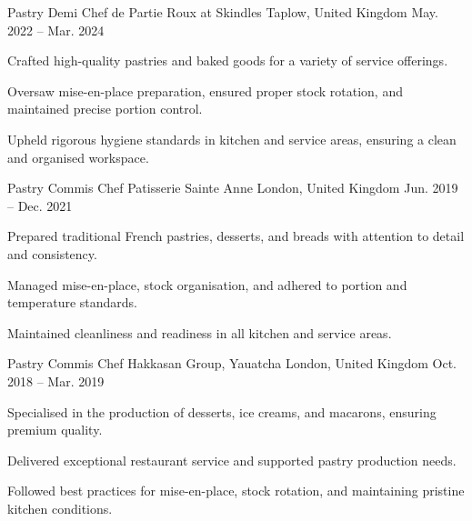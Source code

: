 

\begin{cventries}

  \cventry
    {Pastry Demi Chef de Partie} %
    {Roux at Skindles} %
    {Taplow, United Kingdom} %
    {May. 2022 -- Mar. 2024} %
    {
      \begin{cvitems} %
        \item {Crafted high-quality pastries and baked goods for a variety of service offerings.}
        \item {Oversaw mise-en-place preparation, ensured proper stock rotation, and maintained precise portion control.}
        \columnbreak
        \item {Upheld rigorous hygiene standards in kitchen and service areas, ensuring a clean and organised workspace.}
      \end{cvitems}
    }

  \cventry
    {Pastry Commis Chef} %
    {Patisserie Sainte Anne} %
    {London, United Kingdom} %
    {Jun. 2019 -- Dec. 2021} %
    {
      \begin{cvitems} %
        \item {Prepared traditional French pastries, desserts, and breads with attention to detail and consistency.}
        \item {Managed mise-en-place, stock organisation, and adhered to portion and temperature standards.}
        \columnbreak
        \item {Maintained cleanliness and readiness in all kitchen and service areas.}
      \end{cvitems}
    }

  \cventry
    {Pastry Commis Chef} %
    {Hakkasan Group, Yauatcha} %
    {London, United Kingdom} %
    {Oct. 2018 -- Mar. 2019} %
    {
      \begin{cvitems} %
        \item {Specialised in the production of desserts, ice creams, and macarons, ensuring premium quality.}
        \item {Delivered exceptional restaurant service and supported pastry production needs.}
        \columnbreak
        \item {Followed best practices for mise-en-place, stock rotation, and maintaining pristine kitchen conditions.}
      \end{cvitems}
    }


\end{cventries}
